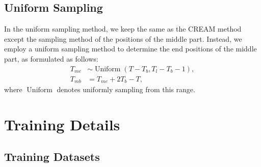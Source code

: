 \subsection{Uniform Sampling}

In the uniform sampling method, we keep the same as the CREAM method except the sampling method of the positions of the middle part. Instead, we employ a uniform sampling method to determine the end positions of the middle part, as formulated as follows: 
\begin{align}
    T_{me} &\sim \operatorname{Uniform}(T-T_b, T_l-T_b-1),\\
    T_{mb} &= T_{me}+2T_b-T,
\end{align}
where $\operatorname{Uniform}$ denotes uniformly sampling from this range.
\section{Training Details}
\label{app:train_details}

\subsection{Training Datasets}

